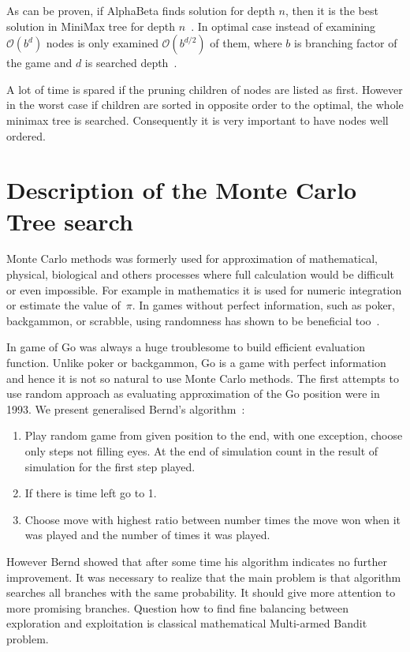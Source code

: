 As can be proven, if AlphaBeta finds solution for depth $n$, then it is the
best solution in MiniMax tree for depth $n$~\cite{knuth:alphabeta}. In optimal
case instead of examining $\mathcal O(b^d)$ nodes is only examined $\mathcal
O(b^{d/2})$ of them, where $b$ is branching factor of the game and $d$ is
searched depth~\cite{ZHONG}.

A lot of time is spared if the pruning children of nodes are listed as first.
However in the worst case if children are sorted in opposite order to the
optimal, the whole minimax tree is searched. Consequently it is very important
to have nodes well ordered.


\section{Description of the Monte Carlo Tree search}
Monte Carlo methods was formerly used for approximation of mathematical,
physical, biological and others processes where full calculation would be
difficult or even impossible. For example in mathematics it is used for numeric
integration or estimate the value of~$\pi$. In games without perfect
information, such as poker, backgammon, or scrabble, using randomness has shown
to be beneficial too~\cite{MonteCarloMethod, MonteCarloGo}.

In game of Go was always a huge troublesome to build efficient evaluation
function. Unlike poker or backgammon, Go is a game with perfect information and
hence it is not so natural to use Monte Carlo methods. The first attempts to
use random approach as evaluating approximation of the Go position were in
1993. We present generalised Bernd's algorithm~\cite{BERND,KOZELEK}:

\begin{enumerate}
\item Play random game from given position to the end, with one exception,
	choose only steps not filling eyes. At the end of simulation count in the
	result of simulation for the first step played.
\item If there is time left go to 1.
\item Choose move with highest ratio between number times the move won when it
	  was played and the number of times it was played.
\end{enumerate}

However Bernd showed that after some time his algorithm indicates no further
improvement. It was necessary to realize that the main problem is that
algorithm searches all branches with the same probability. It should give more
attention to more promising branches. Question how to find fine balancing
between exploration and exploitation is classical mathematical Multi-armed
Bandit problem.

